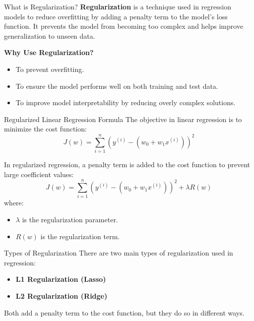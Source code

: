 \documentclass[serif, aspectratio=169]{beamer}
\begin{document}
\begin{frame}{What is Regularization?}
\textbf{Regularization} is a technique used in regression models to reduce overfitting by adding a penalty term to the model's loss function. It prevents the model from becoming too complex and helps improve generalization to unseen data.

\vspace{0.5cm}
\textbf{Why Use Regularization?}
\begin{itemize}
    \item To prevent overfitting.
    \item To ensure the model performs well on both training and test data.
    \item To improve model interpretability by reducing overly complex solutions.
\end{itemize}
\end{frame}

\begin{frame}{Regularized Linear Regression Formula}
The objective in linear regression is to minimize the cost function:
\begin{equation}
J(w) = \sum_{i=1}^{n} \left( y^{(i)} - \left( w_0 + w_1 x^{(i)} \right) \right)^2
\end{equation}

In regularized regression, a penalty term is added to the cost function to prevent large coefficient values:
\begin{equation}
J(w) = \sum_{i=1}^{n} \left( y^{(i)} - \left( w_0 + w_1 x^{(i)} \right) \right)^2 + \lambda R(w)
\end{equation}
where:
\begin{itemize}
    \item $\lambda$ is the regularization parameter.
    \item $R(w)$ is the regularization term.
\end{itemize}
\end{frame}

\begin{frame}{Types of Regularization}
There are two main types of regularization used in regression:
\begin{itemize}
    \item \textbf{L1 Regularization (Lasso)}
    \item \textbf{L2 Regularization (Ridge)}
\end{itemize}
Both add a penalty term to the cost function, but they do so in different ways.
\end{frame}
\end{document}
